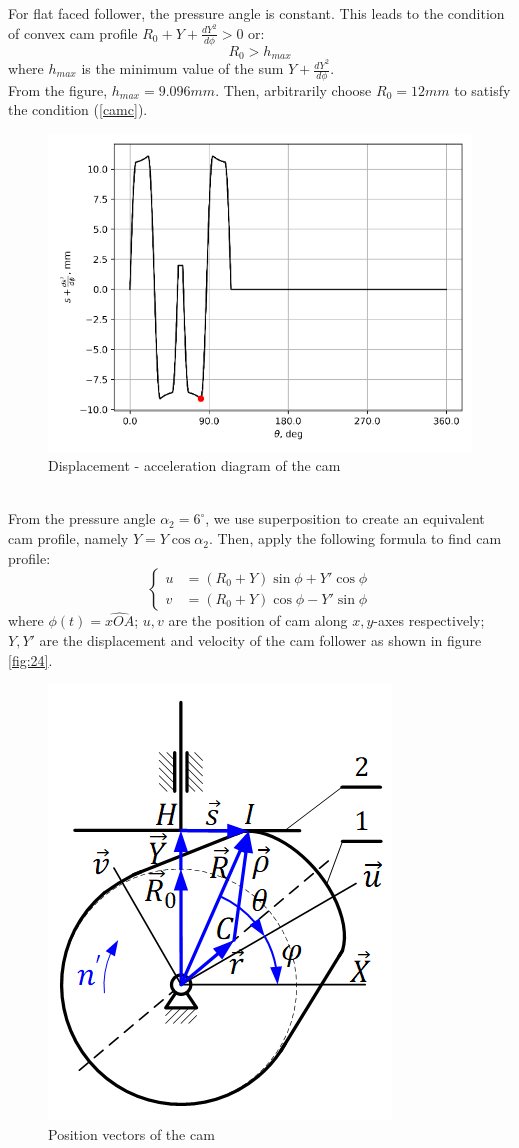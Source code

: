 For flat faced follower, the pressure angle is constant. This leads to the condition of convex cam profile $ R_0+Y+\frac{dY^2}{d\phi}>0 $ or:
\begin{equation}\label{camc}
	R_0> h_{max}
\end{equation}
where $ h_{max} $ is the minimum value of the sum $ Y+\frac{dY^2}{d\phi} $.\\
From the figure, $ h_{max}=9.096\unit{mm} $. Then, arbitrarily choose $ R_0=12\unit{mm} $ to satisfy the condition (\ref{camc}).
\begin{figure}[h]
	\centering
	\includegraphics[width=0.6\linewidth]{25}
	\caption{Displacement - acceleration diagram of the cam}
	\label{fig:25}
\end{figure}\\
From the pressure angle $ \alpha_2=6^\circ $, we use superposition to create an equivalent cam profile, namely $ Y=Y\cos\alpha_2 $. Then, apply the following formula to find cam profile:
\begin{equation}
\left\{
\begin{array}{ll}
u&=(R_0+Y)\sin\phi + Y'\cos\phi\\
v&=(R_0+Y)\cos\phi - Y'\sin\phi
\end{array}
\right.
\end{equation}
where $ \phi(t) =\widehat{xOA}$; $ u,v $ are the position of cam along $ x,y $-axes respectively; $ Y,Y' $ are the displacement and velocity of the cam follower as shown in figure \ref{fig:24}.
\begin{figure}[h]
	\centering
	\includegraphics[width=0.4\linewidth]{26}
	\caption{Position vectors of the cam}
	\label{fig:26}
\end{figure}\\
